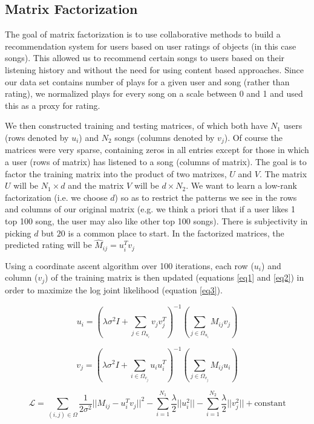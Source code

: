 \documentclass[12pt,preprint]{aastex}
\newcommand{\TRANSPOSE}{\ensuremath{T}}
\begin{document}
\subsection{Matrix Factorization}
The goal of matrix factorization is to use collaborative methods to build a recommendation system for users based on user ratings of objects (in this case songs). This allowed us to recommend certain songs to users based on their listening history and without the need for using content based approaches. Since our data set contains number of plays for a given user and song (rather than rating), we normalized plays for every song on a scale between 0 and 1 and used this as a proxy for rating. 

We then constructed training and testing matrices, of which both have $N_1$ users (rows denoted by $u_i$) and $N_2$ songs (columns denoted by $v_j$). Of course the matrices were very sparse, containing zeros in all entries except for those in which a user (rows of matrix) has listened to a song (columns of matrix). The goal is to factor the training matrix into the product of two matrixes, $U$ and $V$. The matrix $U$ will be $N_1 \times d$ and the matrix $V$ will be $d \times N_2$. We want to learn a low-rank factorization (i.e. we choose $d$) so as to restrict the patterns we see in the rows and columns of our original matrix (e.g. we think a priori that if a user likes 1 top 100 song, the user may also like other top 100 songs). There is subjectivity in picking $d$ but $20$ is a common place to start. In the factorized matrices, the predicted rating will be $\hat{M}_{ij} = u_i^\TRANSPOSE  v_j$ 

Using a coordinate ascent algorithm over 100 iterations, each row ($u_i$) and column ($v_j$) of the training matrix is then updated (equations \ref{eq1} and \ref{eq2}) in order to maximize the log joint likelihood (equation \ref{eq3}). 

\begin{equation}
u_i = \left( \lambda\sigma^2 I + \sum_{j \in \Omega_{u_i}} v_j v_j^\TRANSPOSE \right)^{-1}\left(\sum_{j \in \Omega_{u_i}} M_{ij} v_{j} \right)
\label{eq1}
\end{equation}

\begin{equation}
v_j = \left( \lambda\sigma^2 I + \sum_{i \in \Omega_{v_j}} u_i u_i^\TRANSPOSE  \right)^{-1}\left(\sum_{j \in \Omega_{v_j}} M_{ij} u_{i} \right)
\label{eq2}
\end{equation}

\begin{equation}
\mathcal{L} = \sum_{(i,j) \in \Omega} \frac{1}{2\sigma^2} {|| M_{ij} - u_i^\TRANSPOSE  v_j||}^2 - \sum_{i=1}^{N_1} \frac{\lambda}{2} ||u_i^2 || - \sum_{i=1}^{N_2} \frac{\lambda}{2} ||v_j^2 || + \text{constant}
\label{eq3} 
\end{equation}
\end{document}
